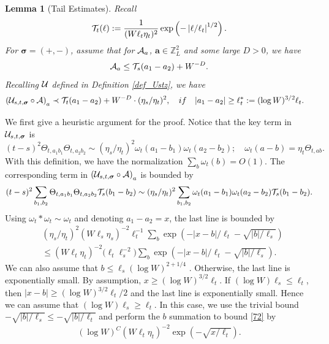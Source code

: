 \documentclass[10pt,reqno]{article}
\theoremstyle{plain} %
\newtheorem{lemma}[theorem]{Lemma}
\theoremstyle{remark}
\numberwithin{equation}{section}
\begin{document}
\begin{lemma}[Tail Estimates]\label{TailtoTail}
Recall  
 $${\cal T}_{t}(\ell) := \frac{1}{(W\ell_t\eta_t)^2} \exp \left(- \left| \ell /\ell_t\right|^{1/2} \right).
$$
For $\boldsymbol{\sigma}=(+,-)$, assume that for ${\cal A}_{\textbf{a}}$, $\textbf{a}\in \mathbb Z^2_L$ and some large $D>0$, we have 
$$
{\cal A}_{\textbf{a}}\le {\cal T}_{s }(a_1-a_2)+W^{-D}. 
$$
Recalling  $\cal U$ defined in Definition  \ref{def_Ustz}, we have 
\begin{align}
\label{neiwuj} 
\left({\cal U}_{s,t,\boldsymbol{\sigma}} \circ 
{\cal A}\right)_{\textbf{a}} & \prec
 {\cal T}_{t}( a_1-a_2)+W^{-D} \cdot(\eta_s/\eta_t)^2, \quad {\rm if}\quad  |a_1-a_2|\ge \ell_t^* :=(\log W)^{3/2}\ell_t . 
\end{align}
 \end{lemma}
We first give a heuristic argument for the proof. Notice that the key term in ${\cal U}_{s,t,\boldsymbol{\sigma}}$ is 
\[
(t-s)^2    \Theta_{t, a_1b_1} \Theta_{t, a_2b_2}
\sim  (\eta_s/\eta_t)^2 \omega_{t}( a_1-b_1)\omega_{t}( a_2-b_2);  \quad 
\omega_{t}(a-b) =  \eta_t  \Theta_{t, ab}.
\]
With this definition, we have the normalization $ \sum_b \omega_{t} (b) = O(1)$.
The corresponding term in $\left({\cal U}_{s,t,\boldsymbol{\sigma}} \circ 
{\cal A}\right)_{\textbf{a}} $ is bounded by 
\begin{align}
(t-s)^2   \sum_{b_1, b_2}  \Theta_{t, a_1b_1} \Theta_{t, a_2b_2} {\cal T}_{s }(b_1-b_2)
\sim (\eta_s/\eta_t)^2  \sum_{b_1, b_2} \omega_{t}( a_1-b_1) \omega_{t}( a_2-b_2) {\cal T}_{s }(b_1-b_2).
\end{align}
Using $\omega_{t} \ast  \omega_{t} \sim  \omega_{t}$ and denoting $a_1-a_2 = x$, the last line is bounded by 
\begin{align}\label{72} 
& (\eta_s/\eta_t)^2  (W\ell_s\eta_s)^{-2}  \ell_t^{-1} \sum_{b}  \exp \left(- | x-b |/\ell_t - \sqrt { | b |/\ell_s  } \right) \nonumber \\
& \le   (W\ell_t\eta_t)^{-2}  \big ( \ell_t \ell_s^{-2} ) \sum_{b}  \exp \left(- | x-b |/\ell_t - \sqrt { | b |/\ell_s  } \right) .
\end{align}
We can also assume that $b \le \ell_s (\log W)^{2+1/4}$ . Otherwise, the last line  is exponentially  small.   By assumption,  $x \ge (\log W)^{3/2}\ell_t$.  If  $(\log W) \ell_s \le \ell_t$,   then  $ |x-b| \ge (\log W)^{3/2}\ell_t/2$  and the last line is exponentially small.  Hence we can assume that  $(\log W) \ell_s \ge \ell_t$. In this case,  we use the trivial bound  $-\sqrt { | b |/\ell_s  } \le -\sqrt { | b |/\ell_t  }$   and perform the $b$ summation to bound   \eqref{72}  by 
\begin{align}
(\log W)^C  (W\ell_t\eta_t)^{-2}    \exp \left( - \sqrt {  x/\ell_t } \right). 
\end{align}
\end{document}
